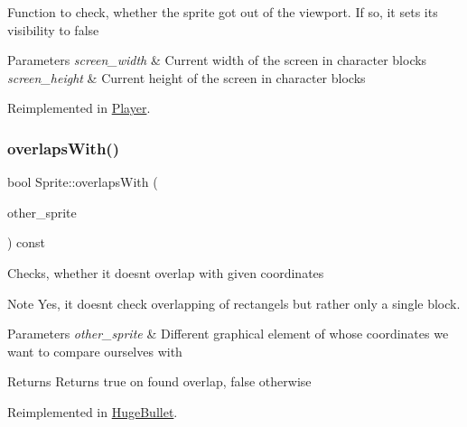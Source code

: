 Function to check, whether the sprite got out of the viewport. If so, it sets it\textquotesingle{}s visibility to false


\begin{DoxyParams}{Parameters}
{\em screen\+\_\+width} & Current width of the screen in character blocks \\
\hline
{\em screen\+\_\+height} & Current height of the screen in character blocks \\
\hline
\end{DoxyParams}


Reimplemented in \hyperlink{classPlayer_a0646b0f8b1db49816338d0be18175fbe}{Player}.

\mbox{\label{classSprite_a631928eb8d8fabce4f888c6ed76c0885}} 
\subsubsection{\texorpdfstring{overlaps\+With()}{overlapsWith()}}
{\footnotesize\ttfamily bool Sprite\+::overlaps\+With (\begin{DoxyParamCaption}\item[{\hyperlink{classSprite}{Sprite} $\ast$}]{other\+\_\+sprite }\end{DoxyParamCaption}) const\hspace{0.3cm}{\ttfamily [virtual]}}

Checks, whether it doesn\textquotesingle{}t overlap with given coordinates \begin{DoxyNote}{Note}
Yes, it doesn\textquotesingle{}t check overlapping of rectangels but rather only a single block.
\end{DoxyNote}

\begin{DoxyParams}{Parameters}
{\em other\+\_\+sprite} & Different graphical element of whose coordinates we want to compare ourselves with \\
\hline
\end{DoxyParams}
\begin{DoxyReturn}{Returns}
Returns true on found overlap, false otherwise 
\end{DoxyReturn}


Reimplemented in \hyperlink{classHugeBullet_a6a617486739894eacb79711c8a24bb9d}{Huge\+Bullet}.

\mbox{\label{classSprite_aad0915304f3b279846eb9868c6651d1a}} 
